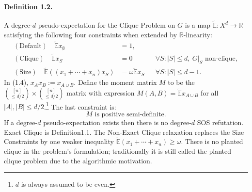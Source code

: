 \paragraph{Definition 1.2.} A degree-$d$ pseudo-expectation for the Clique Problem on $G$ is a map $\widetilde{\mathbb E}:X^d\to\mathbb R$ satisfying the following four constraints when extended by $\mathbb R$-linearity:
\begin{align*}(\text{Default})\quad\widetilde{\mathbb E}x_\emptyset&=1,\tag{1.2}\\(\text{Clique})\quad\widetilde{\mathbb E}x_S&=0&&\forall S:|S|\le d,\ G|_S\text{ non-clique},\tag{1.3}\\(\text{Size})\quad\widetilde{\mathbb E}((x_1+\cdots+x_n)x_S)&=\omega\widetilde{\mathbb E}x_S&&\forall S:|S|\le d-1.\tag{1.4}\end{align*}
In (1.4), $x_Ax_B:=x_{A\cup B}$. Define the moment matrix $M$ to be the $\binom{[n]}{\le d/2}\times\binom{[n]}{\le d/2}$ matrix with expression $M(A,B)=\widetilde{\mathbb E}x_{A\cup B}$ for all $|A|,|B|\le d/2$.\footnote{$d$ is always assumed to be even.} The last constraint is:\[M\text{ is positive semi-definite}.\tag{1.5}\]
If a degree-$d$ pseudo-expectation exists then there is no degree-$d$ SOS refutation. Exact Clique is Definition1.1. The Non-Exact Clique relaxation replaces the Size Constraints by one weaker inequality $\widetilde{\mathbb E}(x_1+\cdots+x_n)\ge\omega$. There is no planted clique in the problem's formulation; traditionally it is still called the planted clique problem due to the algorithmic motivation.
